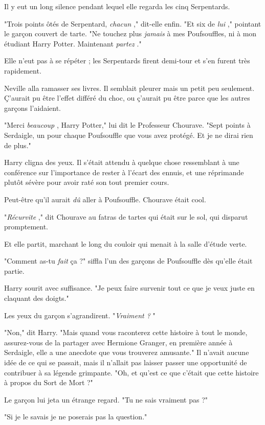 Il y eut un long silence pendant lequel elle regarda les cinq Serpentards.

"Trois points ôtés de Serpentard, \emph{chacun} ," dit-elle enfin. "Et six de \emph{lui} ," pointant le garçon couvert de tarte. "Ne touchez plus \emph{jamais}  à mes Poufsouffles, ni à mon étudiant Harry Potter. Maintenant \emph{partez} ."

Elle n'eut pas à se répéter ; les Serpentards firent demi-tour et s'en furent très rapidement.

Neville alla ramasser ses livres. Il semblait pleurer mais un petit peu seulement. Ç'aurait pu être l'effet différé du choc, ou ç'aurait pu être parce que les autres garçons l'aidaient.

"Merci \emph{beaucoup} , Harry Potter," lui dit le Professeur Chourave. "Sept points à Serdaigle, un pour chaque Poufsouffle que vous avez protégé. Et je ne dirai rien de plus."

Harry cligna des yeux. Il s'était attendu à quelque chose ressemblant à une conférence sur l'importance de rester à l'écart des ennuis, et une réprimande plutôt sévère pour avoir raté son tout premier cours.

Peut-être qu'il aurait \emph{dû}  aller à Poufsouffle. Chourave était cool.

"\emph{Récurvite} ," dit Chourave au fatras de tartes qui était sur le sol, qui disparut promptement.

Et elle partit, marchant le long du couloir qui menait à la salle d'étude verte.

"Comment as-tu \emph{fait}  ça ?" siffla l'un des garçons de Poufsouffle dès qu'elle était partie.

Harry sourit avec suffisance. "Je peux faire survenir tout ce que je veux juste en claquant des doigts."

Les yeux du garçon s'agrandirent. "\emph{Vraiment ?} "

"Non," dit Harry. "Mais quand vous raconterez cette histoire à tout le monde, assurez-vous de la partager avec Hermione Granger, en première année à Serdaigle, elle a une anecdote que vous trouverez amusante." Il n'avait aucune idée de ce qui se passait, mais il n'allait pas laisser passer une opportunité de contribuer à sa légende grimpante. "Oh, et qu'est ce que c'était que cette histoire à propos du Sort de Mort ?"

Le garçon lui jeta un étrange regard. "Tu ne sais vraiment pas ?"

"Si je le savais je ne poserais pas la question."

